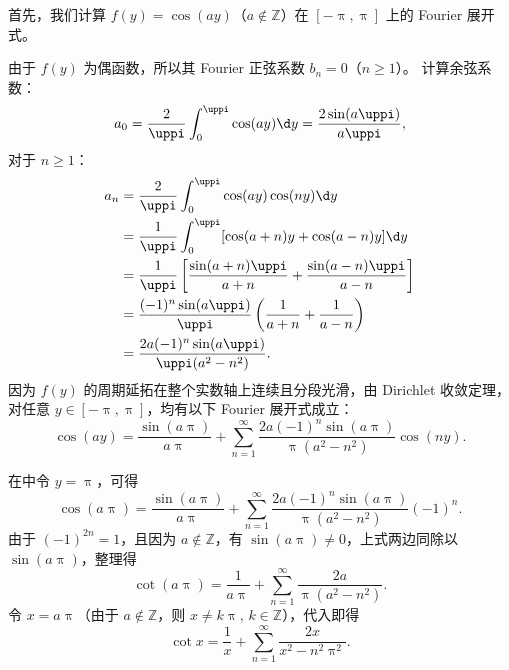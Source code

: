 \begin{myproof}
    首先，我们计算 $f(y) = \cos(ay)$（$a \notin \mathbb{Z}$）在 $[-\uppi, \uppi]$ 上的 Fourier 展开式。

    由于 $f(y)$ 为偶函数，所以其 Fourier 正弦系数 $b_n = 0$（$n \geqslant 1$）。
    计算余弦系数：
    \begin{equation}\label{eq:cos-a0}
        a_0 = \frac{2}{\uppi} \int_{0}^{\uppi} \cos(ay) \d y = \frac{2\sin(a\uppi)}{a\uppi},
    \end{equation}
    对于 $n \geqslant 1$：
    \begin{equation}\label{eq:cos-an}
        \begin{aligned}
            a_n & = \frac{2}{\uppi} \int_{0}^{\uppi} \cos(ay) \cos(ny) \d y                                \\
                & = \frac{1}{\uppi} \int_{0}^{\uppi} [ \cos(a+n)y + \cos(a-n)y ] \d y                      \\
                & = \frac{1}{\uppi} \left[ \frac{\sin(a+n)\uppi}{a+n} + \frac{\sin(a-n)\uppi}{a-n} \right] \\
                & = \frac{(-1)^n \sin(a\uppi)}{\uppi} \left( \frac{1}{a+n} + \frac{1}{a-n} \right)         \\
                & = \frac{2a(-1)^n \sin(a\uppi)}{\uppi (a^2 - n^2)}.
        \end{aligned}
    \end{equation}
    因为 $f(y)$ 的周期延拓在整个实数轴上连续且分段光滑，由 Dirichlet 收敛定理，对任意 $y \in [-\uppi, \uppi]$，均有以下 Fourier 展开式成立：
    \begin{equation}\label{eq:cos-expansion}
        \cos(ay) = \frac{\sin(a\uppi)}{a\uppi} + \sum_{n=1}^{\infty} \frac{2a(-1)^n \sin(a\uppi)}{\uppi (a^2 - n^2)} \cos(ny).
    \end{equation}


    在中令 $y = \uppi$，可得
    \begin{equation}\label{eq:cot-sub}
        \cos(a\uppi) = \frac{\sin(a\uppi)}{a\uppi} + \sum_{n=1}^{\infty} \frac{2a(-1)^n \sin(a\uppi)}{\uppi (a^2 - n^2)} (-1)^n.
    \end{equation}
    由于 $(-1)^{2n} = 1$，且因为 $a \notin \mathbb{Z}$，有 $\sin(a\uppi) \neq 0$，上式两边同除以 $\sin(a\uppi)$，整理得
    \begin{equation}\label{eq:cot-a}
        \cot(a\uppi) = \frac{1}{a\uppi} + \sum_{n=1}^{\infty} \frac{2a}{\uppi (a^2 - n^2)}.
    \end{equation}
    令 $x = a\uppi$（由于 $a \notin \mathbb{Z}$，则 $x \neq k\uppi, \, k \in \mathbb{Z}$），代入即得
    \begin{equation}\label{eq:cot-result}
        \cot x = \frac{1}{x} + \sum_{n=1}^{\infty} \frac{2x}{x^2 - n^2 \uppi^2}.
    \end{equation}


\end{myproof}
